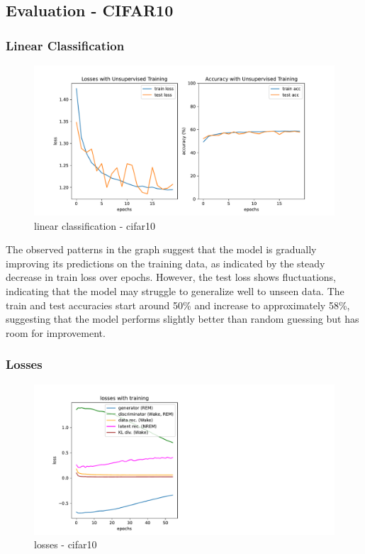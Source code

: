 \documentclass{midl} %
\begin{document}
\subsection{Evaluation - CIFAR10}
\subsubsection{Linear Classification}
\begin{figure} [H]
  \centering
  \includegraphics[width=1.2\textwidth]{linear_classif_cifar10.pdf}
  \caption{linear classification - cifar10}
  \label{fig:linear classification - cifar10}
\end{figure}

The observed patterns in the graph suggest that the model is gradually improving its predictions on the training data, as indicated by the steady decrease in train loss over epochs. However, the test loss shows fluctuations, indicating that the model may struggle to generalize well to unseen data. The train and test accuracies start around 50\% and increase to approximately 58\%, suggesting that the model performs slightly better than random guessing but has room for improvement.

\subsubsection{Losses}
\begin{figure}[ht]
  \centering
  \includegraphics[width=1.2\textwidth]{losses_cifar10.pdf}
  \caption{losses - cifar10}
  \label{fig:losses - cifar10}
\end{figure}
\end{document}
